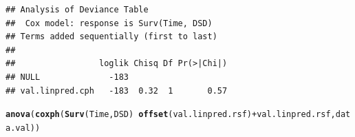 \documentclass{article}\usepackage[]{graphicx}\usepackage[]{color}
\makeatletter
\newcommand{\hlopt}[1]{\textcolor[rgb]{0,0,0}{#1}}%
\newcommand{\hlstd}[1]{\textcolor[rgb]{0.345,0.345,0.345}{#1}}%
\newcommand{\hlkwd}[1]{\textcolor[rgb]{0.737,0.353,0.396}{\textbf{#1}}}%
\newenvironment{kframe}{%
 \def\at@end@of@kframe{}%
 \ifinner\ifhmode%
  \def\at@end@of@kframe{\end{minipage}}%
  \begin{minipage}{\columnwidth}%
 \fi\fi%
 \def\FrameCommand##1{\hskip\@totalleftmargin \hskip-\fboxsep
 \colorbox{shadecolor}{##1}\hskip-\fboxsep
     \hskip-\linewidth \hskip-\@totalleftmargin \hskip\columnwidth}%
 \MakeFramed {\advance\hsize-\width
   \@totalleftmargin\z@ \linewidth\hsize
   \@setminipage}}%
 {\par\unskip\endMakeFramed%
 \at@end@of@kframe}
\newenvironment{knitrout}{}{} %
\makeatother
\begin{document}
\begin{knitrout}
\begin{kframe}
\begin{alltt}
\end{alltt}
\begin{verbatim}
## Analysis of Deviance Table
##  Cox model: response is Surv(Time, DSD)
## Terms added sequentially (first to last)
## 
##                 loglik Chisq Df Pr(>|Chi|)
## NULL              -183                    
## val.linpred.cph   -183  0.32  1       0.57
\end{verbatim}
\begin{alltt}
\hlkwd{anova}\hlstd{(}\hlkwd{coxph}\hlstd{(}\hlkwd{Surv}\hlstd{(Time, DSD)} \hlopt{~} \hlkwd{offset}\hlstd{(val.linpred.rsf)} \hlopt{+} \hlstd{val.linpred.rsf, data.val))}
\end{alltt}


{\ttfamily\noindent\color{warningcolor}{\#\# Warning in fitter(X, Y, strats, offset, init, control, weights = weights, : Ran out of iterations and did not converge}}


\end{kframe}
\end{knitrout}
\end{document}
